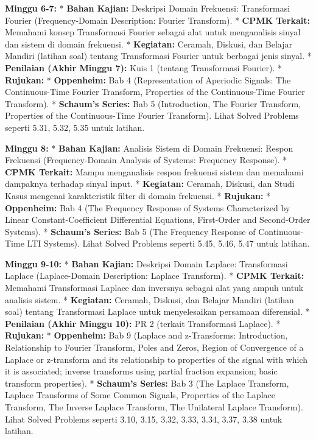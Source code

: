\documentclass[
  letterpaper,
  DIV=11,
  numbers=noendperiod]{scrreprt}
\begin{document}
\textbf{Minggu 6-7:} * \textbf{Bahan Kajian:} Deskripsi Domain
Frekuensi: Transformasi Fourier (Frequency-Domain Description: Fourier
Transform). * \textbf{CPMK Terkait:} Memahami konsep Transformasi
Fourier sebagai alat untuk menganalisis sinyal dan sistem di domain
frekuensi. * \textbf{Kegiatan:} Ceramah, Diskusi, dan Belajar Mandiri
(latihan soal) tentang Transformasi Fourier untuk berbagai jenis sinyal.
* \textbf{Penilaian (Akhir Minggu 7):} Kuis 1 (tentang Transformasi
Fourier). * \textbf{Rujukan:} * \textbf{Oppenheim:} Bab 4
(Representation of Aperiodic Signals: The Continuous-Time Fourier
Transform, Properties of the Continuous-Time Fourier Transform). *
\textbf{Schaum's Series:} Bab 5 (Introduction, The Fourier Transform,
Properties of the Continuous-Time Fourier Transform). Lihat Solved
Problems seperti 5.31, 5.32, 5.35 untuk latihan.

\textbf{Minggu 8:} * \textbf{Bahan Kajian:} Analisis Sistem di Domain
Frekuensi: Respon Frekuensi (Frequency-Domain Analysis of Systems:
Frequency Response). * \textbf{CPMK Terkait:} Mampu menganalisis respon
frekuensi sistem dan memahami dampaknya terhadap sinyal input. *
\textbf{Kegiatan:} Ceramah, Diskusi, dan Studi Kasus mengenai
karakteristik filter di domain frekuensi. * \textbf{Rujukan:} *
\textbf{Oppenheim:} Bab 4 (The Frequency Response of Systems
Characterized by Linear Constant-Coefficient Differential Equations,
First-Order and Second-Order Systems). * \textbf{Schaum's Series:} Bab 5
(The Frequency Response of Continuous-Time LTI Systems). Lihat Solved
Problems seperti 5.45, 5.46, 5.47 untuk latihan.

\textbf{Minggu 9-10:} * \textbf{Bahan Kajian:} Deskripsi Domain Laplace:
Transformasi Laplace (Laplace-Domain Description: Laplace Transform). *
\textbf{CPMK Terkait:} Memahami Transformasi Laplace dan inversnya
sebagai alat yang ampuh untuk analisis sistem. * \textbf{Kegiatan:}
Ceramah, Diskusi, dan Belajar Mandiri (latihan soal) tentang
Transformasi Laplace untuk menyelesaikan persamaan diferensial. *
\textbf{Penilaian (Akhir Minggu 10):} PR 2 (terkait Transformasi
Laplace). * \textbf{Rujukan:} * \textbf{Oppenheim:} Bab 9 (Laplace and
z-Transforms: Introduction, Relationship to Fourier Transform, Poles and
Zeros, Region of Convergence of a Laplace or z-transform and its
relationship to properties of the signal with which it is associated;
inverse transforms using partial fraction expansion; basic transform
properties). * \textbf{Schaum's Series:} Bab 3 (The Laplace Transform,
Laplace Transforms of Some Common Signals, Properties of the Laplace
Transform, The Inverse Laplace Transform, The Unilateral Laplace
Transform). Lihat Solved Problems seperti 3.10, 3.15, 3.32, 3.33, 3.34,
3.37, 3.38 untuk latihan.
\end{document}
